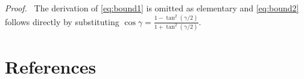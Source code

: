 \documentclass[journal,twoside,web]{ieeecolor}
\theoremstyle{definition}
\renewenvironment{proof}[1][Proof]{\par\pushQED{\qed}\normalfont\textit{#1.}~}{\popQED\par}
\begin{document}
\begin{proof}
The derivation of \eqref{eq:bound1} is omitted as elementary and \eqref{eq:bound2} follows directly by substituting $\cos\gamma=\frac{1-\tan^2(\gamma/2)}{1+\tan^2(\gamma/2)}$.
\end{proof}


\section*{References}
\vspace{-0.6cm}




\end{document}
